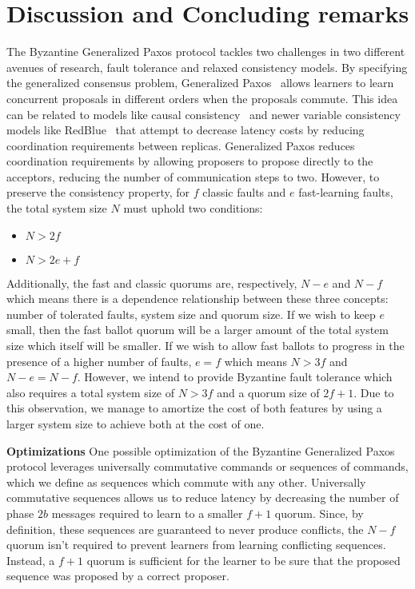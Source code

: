 \section{Discussion and Concluding remarks}
\label{sec:disc}

The Byzantine Generalized Paxos protocol tackles two challenges in two different avenues of research, fault tolerance and relaxed consistency models. By specifying the generalized consensus problem, Generalized Paxos~\cite{Lamport2005} allows learners to learn concurrent proposals in different orders when the proposals commute. This idea can be related to models like causal consistency~\cite{Ahamad1995} and newer variable consistency models like RedBlue~\cite{Li2012} that attempt to decrease latency costs by reducing coordination requirements between replicas. Generalized Paxos reduces coordination requirements by allowing proposers to propose directly to the acceptors, reducing the number of communication steps to two. However, to preserve the consistency property, for $f$ classic faults and $e$ fast-learning faults, the total system size $N$ must uphold two conditions:
\begin{itemize}
	\item $N > 2f$
	\item $N > 2e+f$
\end{itemize} 
Additionally, the fast and classic quorums are, respectively, $N-e$ and $N-f$ which means there is a dependence relationship between these three concepts: number of tolerated faults, system size and quorum size. If we wish to keep $e$ small, then the fast ballot quorum will be a larger amount of the total system size which itself will be smaller. If we wish to allow fast ballots to progress in the presence of a higher number of faults, $e=f$ which means $N >3f$ and $N-e=N-f$. However, we intend to provide Byzantine fault tolerance which also requires a total system size of $N>3f$ and a quorum size of $2f+1$. Due to this observation, we manage to amortize the cost of both features by using a larger system size to achieve both at the cost of one. \par
\textbf{Optimizations} One possible optimization of the Byzantine Generalized Paxos protocol leverages universally commutative commands or sequences of commands, which we define as sequences which commute with any other. Universally commutative sequences allows us to reduce latency by decreasing the number of phase $2b$ messages required to learn to a smaller $f+1$ quorum. Since, by definition, these sequences are guaranteed to never produce conflicts, the $N-f$ quorum isn't required to prevent learners from learning conflicting sequences. Instead, a $f+1$ quorum is sufficient for the learner to be sure that the proposed sequence was proposed by a correct proposer. 
